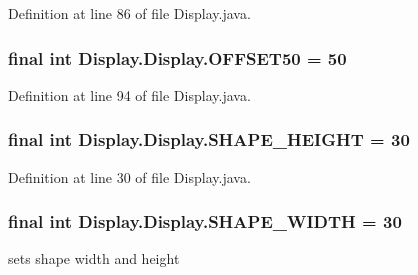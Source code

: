 Definition at line 86 of file Display.\+java.

\hypertarget{class_display_1_1_display_aab4544411ff6ce57f68415f53c73e2dc}{}
\subsubsection[{O\+F\+F\+S\+E\+T50}]{\setlength{\rightskip}{0pt plus 5cm}final int Display.\+Display.\+O\+F\+F\+S\+E\+T50 = 50\hspace{0.3cm}{\ttfamily [static]}}\label{class_display_1_1_display_aab4544411ff6ce57f68415f53c73e2dc}


Definition at line 94 of file Display.\+java.

\hypertarget{class_display_1_1_display_aeb8ee27fb9bb5ab9a43419faba0ff57e}{}
\subsubsection[{S\+H\+A\+P\+E\+\_\+\+H\+E\+I\+G\+H\+T}]{\setlength{\rightskip}{0pt plus 5cm}final int Display.\+Display.\+S\+H\+A\+P\+E\+\_\+\+H\+E\+I\+G\+H\+T = 30\hspace{0.3cm}{\ttfamily [private]}}\label{class_display_1_1_display_aeb8ee27fb9bb5ab9a43419faba0ff57e}


Definition at line 30 of file Display.\+java.

\hypertarget{class_display_1_1_display_a98ff51285260ae5d3e0bf9a640385605}{}
\subsubsection[{S\+H\+A\+P\+E\+\_\+\+W\+I\+D\+T\+H}]{\setlength{\rightskip}{0pt plus 5cm}final int Display.\+Display.\+S\+H\+A\+P\+E\+\_\+\+W\+I\+D\+T\+H = 30\hspace{0.3cm}{\ttfamily [private]}}\label{class_display_1_1_display_a98ff51285260ae5d3e0bf9a640385605}
sets shape width and height 

